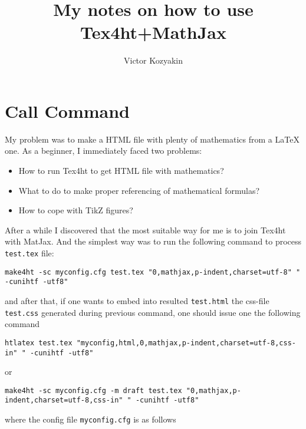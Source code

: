 \documentclass{article}
\title{My notes on how to use Tex4ht+MathJax}
\author{Victor Kozyakin}
\begin{document}
\maketitle

\section{Call Command}\label{S1}
My problem was to make a HTML file with plenty of mathematics from a \LaTeX{}
one. As a beginner, I immediately faced two problems:
\begin{itemize}
\item How to run Tex4ht to get HTML file with mathematics?
\item What to do to make proper referencing of mathematical formulas?
\item How to cope with TikZ figures?
\end{itemize}

After a while I discovered that the most suitable way for me is to join
Tex4ht with MatJax. And the simplest way was to run the following command to
process \verb|test.tex| file:

{\small
\begin{verbatim}
make4ht -sc myconfig.cfg test.tex "0,mathjax,p-indent,charset=utf-8" " -cunihtf -utf8"
\end{verbatim}}
\noindent and after that, if one wants to embed into resulted
\verb|test.html| the css-file \verb|test.css| generated during previous
command, one should issue one the following command {\small
\begin{verbatim}
htlatex test.tex "myconfig,html,0,mathjax,p-indent,charset=utf-8,css-in" " -cunihtf -utf8"
\end{verbatim}
\noindent or
\begin{verbatim}
make4ht -sc myconfig.cfg -m draft test.tex "0,mathjax,p-indent,charset=utf-8,css-in" " -cunihtf -utf8"
\end{verbatim}}
\noindent where the config file \verb|myconfig.cfg| is as
follows
\end{document}
